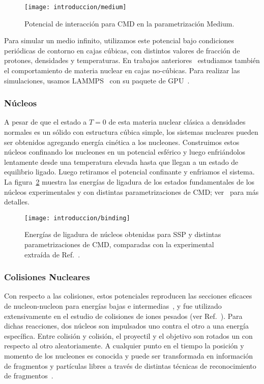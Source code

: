 \begin{figure}[h]
  \centering
  \texttt{[image: introduccion/medium]}
  \caption{Potencial de interacción para CMD en la parametrización Medium.}
\label{fig:medium}
\end{figure}

Para simular un medio infinito, utilizamos este potencial bajo condiciones periódicas de contorno en cajas cúbicas, con distintos valores de fracción de protones, densidades y temperaturas.
En trabajos anteriores~\cite{gimenez_molinelli_finite_2015} estudiamos también el comportamiento de materia nuclear en cajas no-cúbicas.
Para realizar las simulaciones, usamos LAMMPS~\cite{plimpton_fast_1995} con su paquete de GPU~\cite{brown_implementing_2012}.

\subsubsection{Núcleos}
A pesar de que el estado a $T=0$ de esta materia nuclear clásica a densidades normales es un sólido con estructura cúbica simple, los sistemas nucleares pueden ser obtenidos agregando energía cinética a los nucleones.
Construimos estos núcleos confinando los nucleones en un potencial esférico y luego enfriándolos lentamente desde una temperatura elevada hasta que llegan a un estado de equilibrio ligado.
Luego retiramos el potencial confinante y enfriamos el sistema.
La figura~\ref{fig:int_binding} muestra las energías de ligadura de los estados fundamentales de los núcleos experimentales y con distintas parametrizaciones de CMD; ver~\cite{alcain_dynamics_2017} para más detalles.

\begin{figure}[h]
  \centering
  \texttt{[image: introduccion/binding]}
  \caption{Energías de ligadura de núcleos obtenidas para SSP y distintas parametrizaciones de CMD, comparadas con la experimental extraída de Ref.~\cite{alcain_dynamics_2017}.}
\label{fig:int_binding}
\end{figure}

\subsubsection{Colisiones Nucleares}
Con respecto a las colisiones, estos potenciales reproducen las secciones eficaces de nucleon-nucleon para energías bajas e intermedias~\cite{lenk_accuracy_1990}, y fue utilizado extensivamente en el estudio de colisiones de iones pesados (ver Ref.~\cite{chernomoretz_quasiclassical_2002, barranon_time_2007}).
Para dichas reacciones, dos núcleos son impulsados uno contra el otro a una energía específica.
Entre colisión y colisión, el proyectil y el objetivo son rotados un con respecto al otro aleatoriamente.
A cualquier punto en el tiempo la posición y momento de los nucleones es conocida y puede ser transformada en información de fragmentos y partículas libres a través de distintas técnicas de reconocimiento de fragmentos~\cite{dorso_early_1993, dorso_when_1995, strachan_time_1997}.

